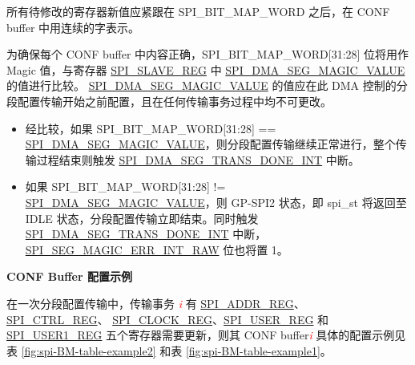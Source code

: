 \documentclass[main\_\_CN.tex]{subfiles}
\begin{document}
所有待修改的寄存器新值应紧跟在 SPI\_BIT\_MAP\_WORD 之后，在 CONF buffer 中用连续的字表示。

为确保每个 CONF buffer 中内容正确，SPI\_BIT\_MAP\_WORD[31:28] 位将用作 Magic 值，与寄存器 \hyperref[regdesc:SPISLAVEREG]{SPI\_SLAVE\_REG} 中 \hyperref[fielddesc:SPIDMASEGMAGICVALUE]{SPI\_DMA\_SEG\_MAGIC\_VALUE} 的值进行比较。 \hyperref[fielddesc:SPIDMASEGMAGICVALUE]{SPI\_DMA\_SEG\_MAGIC\_VALUE} 的值应在此 DMA 控制的分段配置传输开始之前配置，且在任何传输事务过程中均不可更改。

    \begin{itemize}
        \item 经比较，如果 SPI\_BIT\_MAP\_WORD[31:28] == \hyperref[fielddesc:SPIDMASEGMAGICVALUE]{SPI\_DMA\_SEG\_MAGIC\_VALUE}，则分段配置传输继续正常进行，整个传输过程结束则触发 \hyperref[int:SPIDMASEGTRANSDONEINT]{SPI\_DMA\_SEG\_TRANS\_DONE\_INT} 中断。
        \item 如果 SPI\_BIT\_MAP\_WORD[31:28] != \hyperref[fielddesc:SPIDMASEGMAGICVALUE]{SPI\_DMA\_SEG\_MAGIC\_VALUE}，则 GP-SPI2 状态，即 spi\_st 将返回至 IDLE 状态，分段配置传输立即结束。同时触发 \hyperref[int:SPIDMASEGTRANSDONEINT]{SPI\_DMA\_SEG\_TRANS\_DONE\_INT} 中断， \hyperref[fielddesc:SPISEGMAGICERRINTRAW]{SPI\_SEG\_MAGIC\_ERR\_INT\_RAW} 位也将置 1。
    \end{itemize}

\textbf{CONF Buffer 配置示例}\label{sec:gp-spi2-sct-conf-buffer}

在一次分段配置传输中，传输事务 \textcolor{red}{\it i} 有 \hyperref[regdesc:SPIADDRREG]{SPI\_ADDR\_REG}、 \hyperref[regdesc:SPICTRLREG]{SPI\_CTRL\_REG}、 \hyperref[regdesc:SPICLOCKREG]{SPI\_CLOCK\_REG}、\hyperref[regdesc:SPIUSERREG]{SPI\_USER\_REG} 和 \hyperref[regdesc:SPIUSER1REG]{SPI\_USER1\_REG} 五个寄存器需要更新，则其 CONF buffer\textcolor{red}{\it i} 具体的配置示例见表 \ref{fig:spi-BM-table-example2} 和表 \ref{fig:spi-BM-table-example1}。
\end{document}
